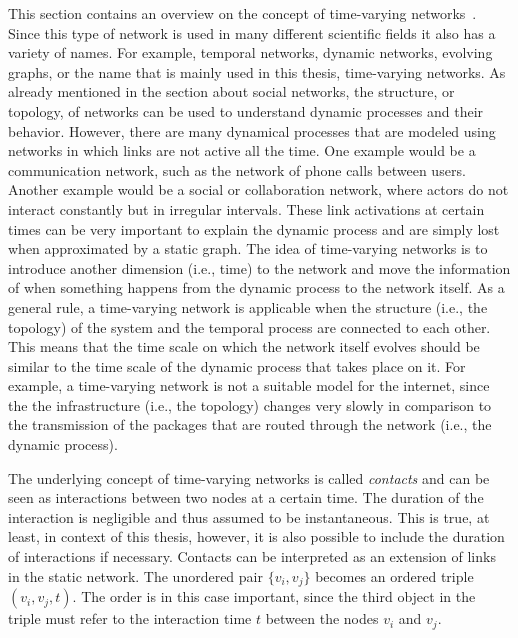 This section contains an overview on the concept of time-varying networks~\cite{Holme2012, Holme2015}.
Since this type of network is used in many different scientific fields it also has a variety of names.
For example, temporal networks, dynamic networks, evolving graphs, or the name that is mainly used in this thesis, time-varying networks.
As already mentioned in the section about social networks, the structure, or topology, of networks can be used to understand dynamic processes and their behavior.
However, there are many dynamical processes that are modeled using networks in which links are not active all the time.
One example would be a communication network, such as the network of phone calls between users.
Another example would be a social or collaboration network, where actors do not interact constantly but in irregular intervals.
These link activations at certain times can be very important to explain the dynamic process and are simply lost when approximated by a static graph.
The idea of time-varying networks is to introduce another dimension (i.e., time) to the network and move the information of when something happens from the dynamic process to the network itself.
As a general rule, a time-varying network is applicable when the structure (i.e., the topology) of the system and the temporal process are connected to each other.
This means that the time scale on which the network itself evolves should be similar to the time scale of the dynamic process that takes place on it.
For example, a time-varying network is not a suitable model for the internet, since the the infrastructure (i.e., the topology) changes very slowly in comparison to the transmission of the packages that are routed through the network (i.e., the dynamic process).

The underlying concept of time-varying networks is called \emph{contacts} and can be seen as interactions between two nodes at a certain time.
The duration of the interaction is negligible and thus assumed to be instantaneous.
This is true, at least, in context of this thesis, however, it is also possible to include the duration of interactions if necessary.
Contacts can be interpreted as an extension of links in the static network.
The unordered pair \(\{v_{i}, v_{j}\}\) becomes an ordered triple \((v_{i}, v_{j}, t)\).
The order is in this case important, since the third object in the triple must refer to the interaction time \(t\) between the nodes \(v_{i}\) and \(v_{j}\).

